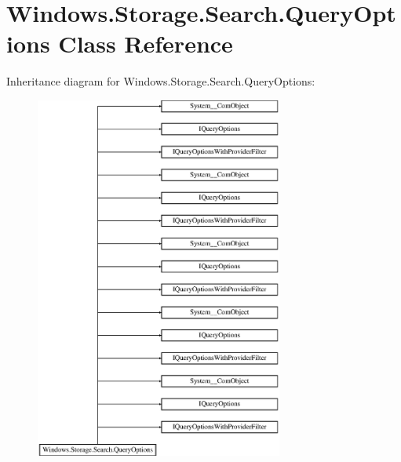 \hypertarget{class_windows_1_1_storage_1_1_search_1_1_query_options}{}\section{Windows.\+Storage.\+Search.\+Query\+Options Class Reference}
\label{class_windows_1_1_storage_1_1_search_1_1_query_options}
Inheritance diagram for Windows.\+Storage.\+Search.\+Query\+Options\+:\begin{figure}[H]
\begin{center}
\leavevmode
\includegraphics[height=12.000000cm]{class_windows_1_1_storage_1_1_search_1_1_query_options}
\end{center}
\end{figure}
